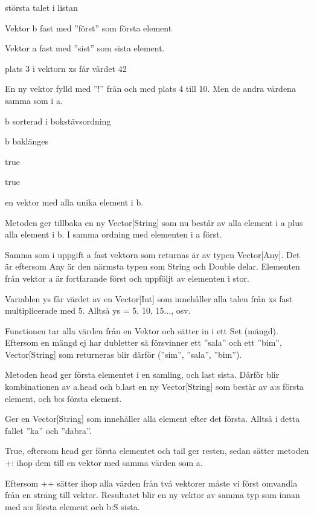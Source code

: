 \Subtask  största talet i listan



\Subtask  Vektor b fast med ''först'' som första element

\Subtask  Vektor a fast med ''sist'' som sista element.

\Subtask  plats 3 i vektorn xs får värdet 42

\Subtask  En ny vektor fylld med ''!'' från och med plats 4 till 10. Men de andra värdena samma som i a.

\Subtask  b sorterad i bokstävsordning

\Subtask  b baklänges

\Subtask  true

\Subtask  true

\Subtask  en vektor med alla unika element i b.

\Task %

\Subtask 
Metoden ger tillbaka en ny Vector[String] som nu består av alla element i a plus alla element i b. I samma ordning med elementen i a först.

\Subtask 
Samma som i uppgift a fast vektorn som returnas är av typen Vector[Any]. Det är eftersom Any är den närmsta typen som String och Double delar. Elementen från vektor a är fortfarande först och uppföljt av elementen i stor.

\Subtask 
Variablen ys får värdet av en Vector[Int] som innehåller alla talen från xs fast multiplicerade med 5. Alltså ys = 5, 10, 15..., osv.

\Subtask 
Functionen tar alla värden från en Vektor och sätter in i ett Set (mängd). Eftersom en mängd ej har dubletter så försvinner ett ''sala'' och ett ''bim'', Vector[String] som returneras blir därför (''sim'', ''sala'', ''bim'').

\Subtask 
Metoden head ger första elementet i en samling, och last sista. Därför blir kombinationen av a.head och b.last en ny Vector[String] som består av a:s första element, och b:s första element.

\Subtask 
Ger en Vector[String] som innehåller alla element efter det första. Alltså i detta fallet ''ka'' och ''dabra''.

\Subtask 
True, eftersom head ger första elementet och tail ger resten, sedan sätter metoden +: ihop dem till en vektor med samma värden som a.

\Subtask 
Eftersom ++ sätter ihop alla värden från två vektorer måste vi först omvandla från en sträng till vektor. Resultatet blir en ny vektor av samma typ som innan med a:s första element och b:S sista.

